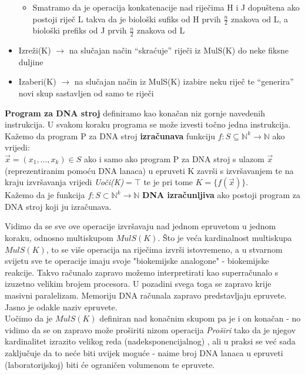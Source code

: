 \documentclass[12pt, a4paper]{book}
\begin{document}
\begin{spacing}{1.5}
\begin{defn}
\begin{itemize}
\begin{itemize}
                \item Smatramo da je operacija konkatenacije nad riječima H i J dopuštena ako postoji riječ L takva da je biološki sufiks od H prvih $\frac{n}{2}$  znakova od L, a biološki prefiks od J prvih $\frac{n}{2}$ znakova od L
            \end{itemize}
    \item Izreži(K) $\to$ na slučajan način “skraćuje” riječi iz MulS(K) do neke fiksne duljine
    \item Izaberi(K) $\to$ na slučajan način iz MulS(K) izabire neku riječ te “generira” novi skup sastavljen od samo te riječi

    \end{itemize}
    \textbf{Program za DNA stroj} definiramo kao konačan niz gornje navedenih instrukcija. U svakom koraku programa se može izvesti točno jedna instrukcija.  Kažemo da program P za DNA stroj \textbf{izračunava} funkciju $f:S \subseteq \mathbb{N}^k \to \mathbb{N}$ ako vrijedi:\\
$\vec{x}=(x_1,...,x_k) \in S$ ako i samo ako program P za DNA stroj s ulazom  $\vec{x}$ (reprezentiranim pomoću DNA lanaca) u epruveti K završi s izvršavanjem te na kraju izvršavanja vrijedi \textit{Uoči(K)}$=\top$ te je pri tome $K=\{f(\vec{x})\}$.\\
Kažemo da je funkcija $f: S\subset \mathbb{N}^k \to \mathbb{N}$ \textbf{DNA izračunljiva} ako postoji program za DNA stroj koji ju izračunava.
\end{defn}
\begin{nap}
Vidimo da se sve ove operacije izvršavaju nad jednom epruvetom u jednom koraku, odnosno multiskupom $MulS(K)$. Što je veća kardinalnost multiskupa $MulS(K)$, to se više operacija na riječima izvrši istovremeno, a u stvarnom svijetu sve te operacije imaju svoje "biokemijske analogone" - biokemijske reakcije. Takvo računalo zapravo možemo interpretirati kao superračunalo s izuzetno velikim brojem procesora. U pozadini svega toga se zapravo krije masivni paralelizam. Memoriju DNA računala zapravo predstavljaju epruvete. Jasno je odakle naziv epruvete.\\
Uočimo da je $MulS(K)$ definiran nad konačnim skupom pa je i on konačan - no vidimo da se on zapravo može proširiti nizom operacija \textit{Proširi} tako da je njegov kardinalitet izrazito velikog reda (nadeksponencijalnog) , ali u praksi se već sada zaključuje da to neće biti uvijek moguće - naime broj DNA lanaca u epruveti (laboratorijskoj) biti će ograničen volumenom te epruvete.\\

\end{nap}
\end{spacing}
\end{document}
